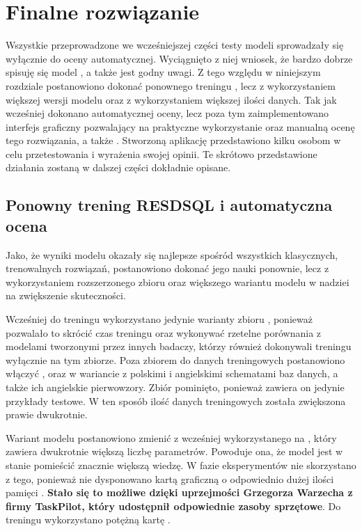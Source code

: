 \chapter{Finalne rozwiązanie}
Wszystkie przeprowadzone we wcześniejszej części testy modeli sprowadzały się wyłącznie do oceny automatycznej. Wyciągnięto z niej wniosek, że bardzo dobrze spisuję się model , a  także jest godny uwagi. Z tego względu w niniejszym rozdziale postanowiono dokonać ponownego treningu , lecz z wykorzystaniem większej wersji modelu  oraz z wykorzystaniem większej ilości danych. Tak jak wcześniej dokonano automatycznej oceny, lecz poza tym zaimplementowano interfejs graficzny pozwalający na praktyczne wykorzystanie oraz manualną ocenę tego rozwiązania, a także . Stworzoną aplikację przedstawiono kilku osobom w celu przetestowania i wyrażenia swojej opinii. Te skrótowo przedstawione działania zostaną w dalszej części dokładnie opisane.

\section{Ponowny trening RESDSQL i automatyczna ocena}
Jako, że wyniki modelu  okazały się najlepsze spośród wszystkich klasycznych, trenowalnych rozwiązań, postanowiono dokonać jego nauki ponownie, lecz z wykorzystaniem rozszerzonego zbioru oraz większego wariantu modelu  w nadziei na zwiększenie skuteczności.

Wcześniej do treningu wykorzystano jedynie warianty zbioru , ponieważ pozwalało to skrócić czas treningu oraz wykonywać rzetelne porównania z modelami tworzonymi przez innych badaczy, którzy również dokonywali treningu wyłącznie na tym zbiorze. Poza zbiorem  do danych treningowych postanowiono włączyć ,  oraz  w wariancie z polskimi i angielskimi schematami baz danych, a także ich angielskie pierwowzory. Zbiór  pominięto, ponieważ zawiera on jedynie przykłady testowe. W ten sposób ilość danych treningowych została zwiększona prawie dwukrotnie.

Wariant modelu  postanowiono zmienić z wcześniej wykorzystanego  na , który zawiera dwukrotnie większą liczbę parametrów. Powoduje ona, że model jest w stanie pomieścić znacznie większą wiedzę. W fazie eksperymentów nie skorzystano z tego, ponieważ nie dysponowano kartą graficzną o odpowiednio dużej ilości pamięci . \textbf{Stało się to możliwe dzięki uprzejmości Grzegorza Warzecha z firmy TaskPilot, który udostępnił odpowiednie zasoby sprzętowe}. Do treningu wykorzystano potężną kartę .

